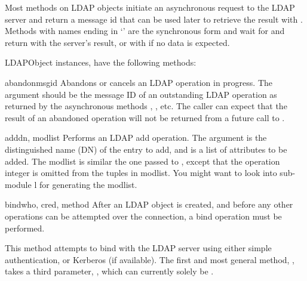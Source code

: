 Most methods on LDAP objects initiate an asynchronous request to the
LDAP server and return a message id that can be used later to retrieve
the result with .
Methods with names ending in `' are the synchronous form 
and wait for and return with the server's result, or with
 if no data is expected.

LDAPObject instances, have the following methods:


\begin{methoddesc}[LDAPObject]{abandon}{msgid}
Abandons or cancels an LDAP operation in progress. The  argument
should be the message ID of an outstanding LDAP operation as returned by
the asynchronous methods , , etc. 
The caller can expect that the result
of an abandoned operation will not be returned from a future call to 
.
\end{methoddesc}


\begin{methoddesc}[LDAPObject]{add}{dn, modlist} %
Performs an LDAP add operation. The  argument is the distinguished
name (DN) of the entry to add, and  is a list of attributes to be
added. The modlist is similar the one passed to , except that the
operation integer is omitted from the tuples in modlist. You might want to
look into sub-module l for generating the modlist.
\end{methoddesc}


\begin{methoddesc}[LDAPObject]{bind}{who, cred, method} %
After an LDAP object is created, and before any other operations can be
attempted over the connection, a bind operation must be performed.

This method attempts to bind with the LDAP server using 
either simple authentication, or Kerberos (if available).
The first and most general method, ,
takes a third parameter, , which can currently solely
be .
\end{methoddesc}

